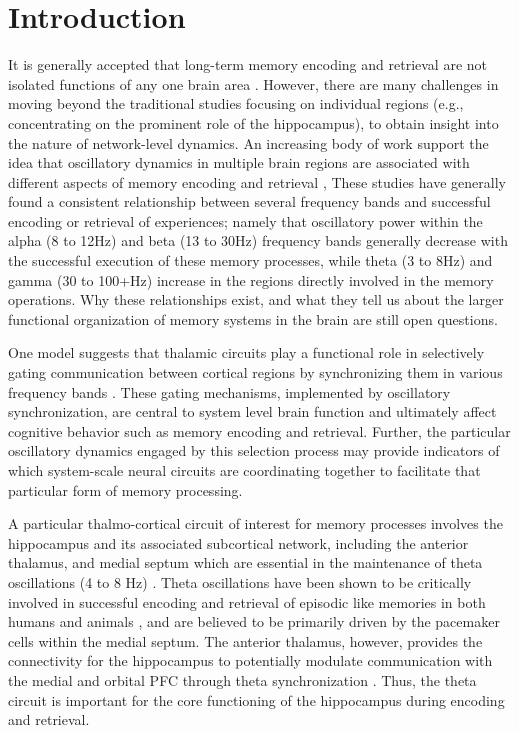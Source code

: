 \documentclass[11pt, titlepage, twoside]{article}
\begin{document}
\section{Introduction}\label{sec:intro}

It is generally accepted that long-term memory encoding and retrieval are not isolated functions of any one brain area \cite{Gabrieli98,PrinceDaselaarCabeza05}.  However, there are many challenges in moving beyond the traditional studies focusing on individual regions  (e.g., concentrating on the prominent role of the hippocampus), to obtain insight into the nature of network-level dynamics.  An increasing body of work support the idea that oscillatory dynamics in multiple brain regions are associated with different aspects of  memory encoding and retrieval \cite{NyhusCurran10,HanslmayrStaudiglFellner12,Klimesch12}, %
These studies have generally found a consistent relationship between several frequency bands and successful encoding or retrieval of experiences; namely that oscillatory power within the alpha (8 to 12Hz) and beta (13 to 30Hz) frequency bands generally decrease with the successful execution of these memory processes, while theta (3 to 8Hz) and gamma (30 to 100+Hz) increase in the regions directly involved in the memory operations. Why these relationships exist, and what they tell us about the larger functional organization of memory systems in the brain are still open questions.
 
One model suggests that thalamic circuits play a functional role in selectively gating communication between cortical regions by synchronizing them in various frequency bands \cite{ShermanGuillery06,SaalmannKastner11,KetzJensenOReilly15}.  These gating mechanisms, implemented  by oscillatory synchronization, are central to system level brain function and ultimately affect cognitive behavior such as memory encoding and retrieval.  Further, the particular oscillatory dynamics engaged by this selection process may provide indicators of which system-scale neural circuits are coordinating together to facilitate that particular form of memory processing.

A particular thalmo-cortical circuit of interest for memory processes involves the hippocampus and its associated subcortical network, including the anterior thalamus, and medial septum which are essential in the maintenance of theta oscillations (4 to 8 Hz) \cite{Buzsaki02}.  Theta oscillations have been shown to be critically involved in successful encoding and retrieval of episodic like memories in both humans and animals \cite{NyhusCurran10,JonesWilson05,FuentemillaBarnesDuzelEtAl14}, and are believed to be primarily driven by the pacemaker cells within the medial septum.  The anterior thalamus, however,  provides the connectivity for the hippocampus to potentially modulate communication with the medial and orbital PFC through theta synchronization \cite{VanderWerfJollesWitterEtAl03,AggletonDumontWarburton11}.  Thus, the theta circuit is important for the core functioning of the hippocampus during encoding and retrieval.
\end{document}
